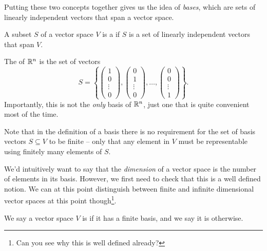 \documentclass[a4paper]{scrartcl}
\begin{document}
Putting these two concepts together gives us the idea of \emph{bases}, which are sets of linearly independent vectors that span a vector space.

\begin{definition}[Basis]
    A subset $S$ of a vector space $V$ is a  if $S$ is a set of linearly independent vectors that span $V$.
\end{definition}

\begin{example}
    The  of $\mathbb{R}^n$ is the set of vectors
    $$
    S = \left\{
        \begin{pmatrix}1 \\ 0 \\ \vdots \\ 0\end{pmatrix},
        \begin{pmatrix}0 \\ 1 \\ \vdots \\ 0\end{pmatrix},
        \dots,
        \begin{pmatrix}0 \\ 0 \\ \vdots \\ 1\end{pmatrix}
    \right\}.
    $$
    Importantly, this is not the \emph{only} basis of $\mathbb{R}^n$, just one that is quite convenient most of the time.
\end{example}

\begin{remark}
    Note that in the definition of a basis there is no requirement for the set of basis vectors $S \subseteq V$ to be finite -- only that any element in $V$ must be representable using finitely many elements of $S$. 
\end{remark}

We'd intuitively want to say that the \emph{dimension} of a vector space is the number of elements in its basis. However, we first need to check that this is a well defined notion.
We can at this point distinguish between finite and infinite dimensional vector spaces at this point though\footnote{Can you see why this is well defined already?}.

\begin{definition}
    We say a vector space $V$ is  if it has a finite basis, and we say it is  otherwise.
\end{definition}
\end{document}
